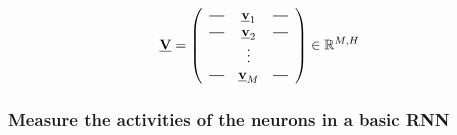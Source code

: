 \begin{frame}
\begin{itemize}
{\begin{equation}
\vec V = 
\left(
\begin{array}{ccc}
  \horzbar & \vec v_1 &  \horzbar \\
  \horzbar & \vec v_2 &  \horzbar \\
		   & \vdots    &          \\
  \horzbar & \vec v_M &  \horzbar
\end{array}
\right) \in \R^{M,H}
\end{equation}
}
\end{itemize}

\end{frame}

\newpage

\subsubsection{Measure the activities of the neurons in a basic RNN}

